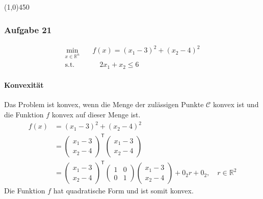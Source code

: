 \documentclass{article}
\newcommand{\hr}{\begin{center} \line(1,0){450} \end{center}}
\newcommand{\R}{\mathbb R}
\newcommand{\tr}{^\mathsf{T}}
\begin{document}
\hr
\subsubsection*{Aufgabe 21}

\begin{equation*}
    \begin{split}
     \min\limits_{x \in \mathbb{R}^n} &\quad f(x) = (x_1 - 3)^2 + (x_2 -4)^2\\
    \text{s.t.} &\quad \quad 2x_1 + x_2 \leq 6  
\end{split}
\end{equation*}

\paragraph{Konvexität}
Das Problem ist konvex, wenn die Menge der zulässigen Punkte $\mathcal{C}$ konvex ist und die Funktion $f$ konvex auf dieser Menge ist.
\begin{align*}
    f(x) &= \left(x_1 - 3\right)^2 + \left(x_2 -4\right)^2\\
    &= \begin{pmatrix}x_1-3\\x_2 -4\end{pmatrix}\tr \begin{pmatrix}x_1-3\\x_2 -4\end{pmatrix}\\
    &= \begin{pmatrix}x_1-3\\x_2 -4\end{pmatrix}\tr \begin{pmatrix}1&0\\0&1\end{pmatrix}  \begin{pmatrix}x_1-3\\x_2 -4\end{pmatrix} + 0_2 r + 0_2, \quad r \in \R^2
\end{align*}
Die Funktion $f$ hat quadratische Form und ist somit konvex.








\end{document}
